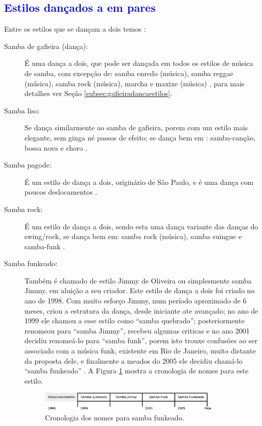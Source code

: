 \subsection{\textcolor{blue}{Estilos dançados a em pares}}
Entre os estilos que se dançam a dois temos \cite[pp. 134]{perna2002samba}:
\begin{description}
\item[Samba de gafieira (dança):] É uma dança a dois, que pode ser dançada em todos os estilos de música de samba,
com excepção de: samba enredo (música), samba reggae (música), samba rock (música), marcha e maxixe (música) \cite[pp. 134]{perna2002samba}, para mais detalhes ver Seção \ref{subsec:gafieiradancaestilos}.

\item[Samba liso:] 
Se dança similarmente ao samba de gafieira, 
porem com um estilo mais elegante, sem ginga né passos de efeito;
se dança bem em : samba-canção, bossa nova e choro \cite[pp. 134]{perna2002samba}.

\item[Samba pagode:] 
É um estilo de dança a dois, originário de São Paulo, 
e é uma dança com poucos deslocamentos \cite[pp. 134]{perna2002samba}.

\item[Samba rock:] 
É um estilo de dança a dois, sendo esta uma dança variante das danças do swing/rock,
se dança bem em: samba rock (música), samba suingue e samba-funk \cite[pp. 135, 138]{perna2002samba}.

\item[Samba funkeado:] 
Também é chamado de estilo Jimmy de Oliveira ou simplesmente  samba Jimmy, 
em aluição a seu criador.
Este estilo de dança a dois foi criado no ano de 1998.
Com muito esforço Jimmy, num período aproximado de 6 meses, 
criou a estrutura da dança, desde iniciante ate avançado;
no ano de 1999 ele  chamou a esse estilo como ``samba quebrado'';  
posteriormente renomeou  para ``samba Jimmy'', 
recebeu algumas criticas e no ano 2001 decidiu renomeá-lo para ``samba funk'',
porem isto trouxe confusões   ao ser associado com a música funk, existente em Rio de Janeiro,
muito distante da proposta dele, e
finalmente a meados do 2005 ele decidiu chamá-lo ``samba funkeado''  \cite{sambafunkeadoJimmyDeOliveiraPart1}.
A Figura \ref{fig:funkeadocrono1} mostra a cronologia de nomes para este estilo.
\begin{figure}[h]
  \centering
    \includegraphics[width=0.85\textwidth]{chapters/cap-historia-musicasamba/sambafunkeado.eps}
  \caption{Cronologia dos nomes para samba funkeado.}
\label{fig:funkeadocrono1}
\end{figure}


\end{description}
